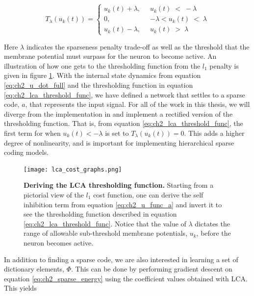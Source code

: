\begin{equation}\label{eq:ch2_lca_threshold_func}
    T_{\lambda}(u_{k}(t)) = \left\{
    \begin{aligned}
        u_{k}(t)+\lambda,\;\; &u_{k}(t)\; <\; -\lambda \\
        0,\;\; &-\lambda < u_{k}(t)\; <\; \lambda \\
        u_{k}(t)-\lambda,\;\; &u_{k}(t)\; >\; \lambda
    \end{aligned}
    \right.
\end{equation}

Here $\lambda$ indicates the sparseness penalty trade-off as well as the threshold that the membrane potential must surpass for the neuron to become active. An illustration of how one gets to the thresholding function from the $l_{1}$ penalty is given in figure \ref{fig:ch2_lca_thresh}. With the internal state dynamics from equation \eqref{eq:ch2_u_dot_full} and the thresholding function in equation \eqref{eq:ch2_lca_threshold_func}, we have defined a network that settles to a sparse code, $a$, that represents the input signal. For all of the work in this thesis, we will diverge from the implementation in \parencite{rozell2008sparse} and implement a rectified version of the thresholding function. That is, from equation \ref{eq:ch2_lca_threshold_func}, the first term for when $u_{k}(t) < -\lambda$ is set to $T_{\lambda}(u_{k}(t))=0$. This adds a higher degree of nonlinearity, and is important for implementing hierarchical sparse coding models.

\begin{figure}[h]\label{fig:ch2_lca_thresh}
\centering %
\texttt{[image: lca\_cost\_graphs.png]}
\caption{\textbf{Deriving the LCA thresholding function.} Starting from a pictorial view of the $l_{1}$ cost function, one can derive the self inhibition term from equation \eqref{eq:ch2_u_func_a} and invert it to see the thresholding function described in equation \eqref{eq:ch2_lca_threshold_func}. Notice that the value of $\lambda$ dictates the range of allowable sub-threshold membrane potentials, $u_{k}$, before the neuron becomes active.}
\end{figure}

In addition to finding a sparse code, we are also interested in learning a set of dictionary elements, $\Phi$. This can be done by performing gradient descent on equation \eqref{eq:ch2_sparse_energy} using the coefficient values obtained with LCA. This yields

